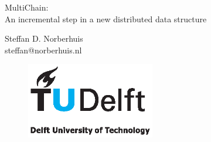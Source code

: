 \begin{titlepage}

\null\vfill

\begin{center}
\LARGE{MultiChain:\\
       		An incremental step in a new distributed data structure}
\end{center}

\vspace{1.5cm}

\begin{center}
Steffan D. Norberhuis\\
steffan@norberhuis.nl
\end{center}

\vfill

\begin{figure}[!b]
\centering
\includegraphics[width={0.5\textwidth}]{pics/TUD_logo_color.eps}
\end{figure}

\vspace{2.0cm}

\end{titlepage}
